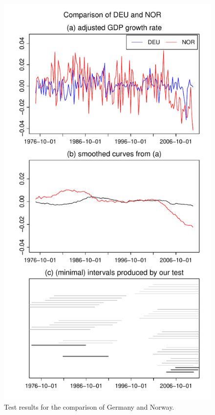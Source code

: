 \documentclass[a4paper,12pt]{article}
\begin{document}
\begin{figure}[t!]
\begin{minipage}[t]{0.49\textwidth}
\includegraphics[width=\textwidth]{output/plots/gdp/DEU_vs_NOR}
\caption{Test results for the comparison of Germany and Norway.}\label{fig:Germany:Norway}
\end{minipage}
\hspace{0.25cm}

\end{figure}
\end{document}
